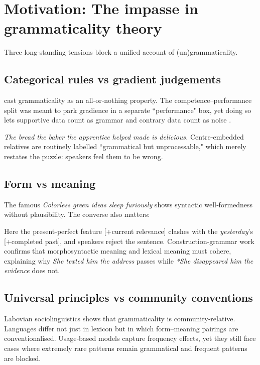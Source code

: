 \documentclass[12pt]{article}
\begin{document}
\section{Motivation: The impasse in grammaticality theory}

Three long‑standing tensions block a unified account of (un)grammaticality.

\subsection{Categorical rules vs gradient judgements}

\textcite{chomsky1957} cast grammaticality as an all‑or‑nothing property.  
The competence–performance split was meant to park gradience in a separate ``performance" box, yet doing so lets supportive data count as grammar and contrary data count as noise \parencite[71]{schutze2016}.

\ea
\textit{The bread the baker the apprentice helped made is delicious.}
\z
Centre‑embedded relatives are routinely labelled ``grammatical but unprocessable," which merely restates the puzzle: speakers feel them to be wrong.

\subsection{Form vs meaning}

The famous \textit{Colorless green ideas sleep furiously} shows syntactic well‑formedness without plausibility.  The converse also matters:

\z
Here the present‑perfect feature [+current relevance] clashes with the \textit{yesterday}'s [+completed past], and speakers reject the sentence.  Construction‑grammar work \parencite{goldberg1995constructions} confirms that morphosyntactic meaning and lexical meaning must cohere, explaining why \textit{She texted him the address} passes while \textit{*She disappeared him the evidence} does not.

\subsection{Universal principles vs community conventions}

Labovian sociolinguistics \parencite{labov1972} shows that grammaticality is community‑relative.  Languages differ not just in lexicon but in which form–meaning pairings are conventionalised.  Usage‑based models capture frequency effects, yet they still face cases where extremely rare patterns remain grammatical and frequent patterns are blocked.
\end{document}
